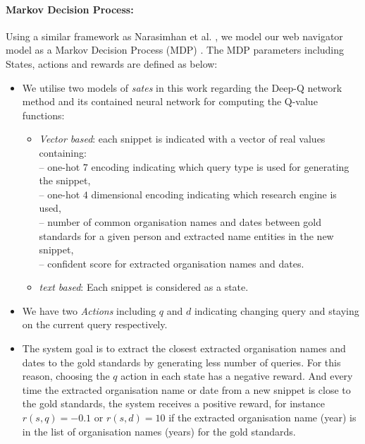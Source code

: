 \paragraph{Markov Decision Process: } Using a similar framework as Narasimhan et al. , we model our web navigator model as a Markov Decision Process (MDP) \cite{puterman1994}. The MDP parameters including States, actions and rewards are defined as below:

\begin{itemize}
	\item %
	 We utilise two models of \textit{sates} in this work regarding the Deep-Q network method and its contained neural network for computing the Q-value functions:
	\begin{itemize}
		\item \textit{Vector based}: each snippet is indicated with a vector of real values containing: \\
		-- one-hot $7$ encoding indicating which query type is used for generating the snippet,\\
	    -- one-hot $4$ dimensional encoding indicating which research engine is used, \\
		-- number of common organisation names and dates between gold standards for a given person and extracted name entities in the new snippet,\\
        -- confident score for extracted organisation names and dates. 
		\item \textit{text based}: Each snippet is considered as a state.
	\end{itemize}
	\item We have two \textit{Actions} including $q$ and $d$ indicating changing query and staying on the current query respectively. 
	\item The system goal is to extract the closest extracted organisation names and dates to the gold standards by generating less number of queries. For this reason, choosing the $q$ action in each state has a negative reward. And every time the extracted organisation name or date from a new snippet is close to the gold standards, the system receives a positive reward, for instance $r(s, q) = -0.1$ or $r(s, d) = 10$ if the extracted organisation name (year) is in the list of organisation names (years) for the gold standards. 
\end{itemize}

